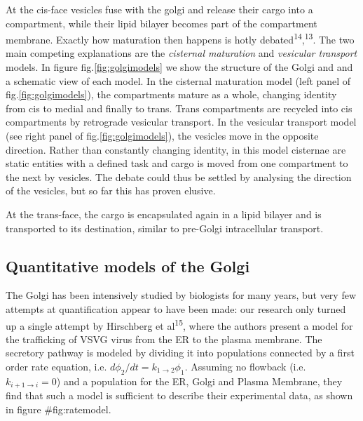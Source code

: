 \documentclass{Dissertate}
\begin{document}
At the cis-face vesicles fuse with the golgi and release their cargo
into a compartment, while their lipid bilayer becomes part of the
compartment membrane. Exactly how maturation then happens is hotly
debated\textsuperscript{14},\textsuperscript{13}. The two main competing
explanations are the \emph{cisternal maturation} and \emph{vesicular
transport} models. In figure fig.\ref{fig:golgimodels} we show the
structure of the Golgi and and a schematic view of each model. In the
cisternal maturation model (left panel of fig.\ref{fig:golgimodels}),
the compartments mature as a whole, changing identity from cis to medial
and finally to trans. Trans compartments are recycled into cis
compartments by retrograde vesicular transport. In the vesicular
transport model (see right panel of fig.\ref{fig:golgimodels}), the
vesicles move in the opposite direction. Rather than constantly changing
identity, in this model cisternae are static entities with a defined
task and cargo is moved from one compartment to the next by vesicles.
The debate could thus be settled by analysing the direction of the
vesicles, but so far this has proven elusive.

At the trans-face, the cargo is encapsulated again in a lipid bilayer
and is transported to its destination, similar to pre-Golgi
intracellular transport.

\hypertarget{quantitative-models-of-the-golgi}{%
\subsection{Quantitative models of the
Golgi}\label{quantitative-models-of-the-golgi}}

The Golgi has been intensively studied by biologists for many years, but
very few attempts at quantification appear to have been made: our
research only turned up a single attempt by Hirschberg et
al\textsuperscript{15}, where the authors present a model for the
trafficking of VSVG virus from the ER to the plasma membrane. The
secretory pathway is modeled by dividing it into populations connected
by a first order rate equation, i.e.
\(d \phi_{2}/dt=k_{1\to2}\phi_{1}\). Assuming no flowback (i.e.
\(k_{i+1\to i}=0\)) and a population for the ER, Golgi and Plasma
Membrane, they find that such a model is sufficient to describe their
experimental data, as shown in figure \#fig:ratemodel.
\end{document}
